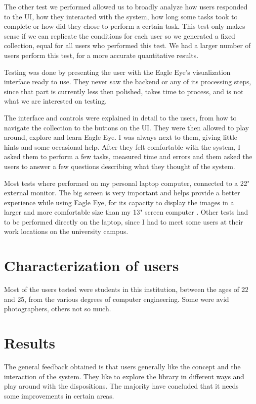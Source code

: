 The other test we performed allowed us to broadly analyze how users responded to the \ac{UI}, how they interacted with the system, how long some tasks took to complete or how did they chose to perform a certain task. This test only makes sense if we can replicate the conditions for each user so we generated a fixed collection, equal for all users who performed this test. We had a larger number of users perform this test, for a more accurate quantitative results. 

Testing was done by presenting the user with the Eagle Eye's visualization interface ready to use. They never saw the backend or any of its processing steps, since that part is currently less then polished, takes time to process, and is not what we are interested on testing.

The interface and controls were explained in detail to the users, from how to navigate the collection to the buttons on the \ac{UI}. They were then allowed to play around, explore and learn Eagle Eye. I was always next to them, giving little hints and some occasional help. After they felt comfortable with the system, I asked them to perform a few tasks, measured time and errors and them asked the users to answer a few questions describing what they thought of the system.

Most tests where performed on my personal laptop computer, connected to a 22" external monitor. The big screen is very important and helps provide a better experience while using Eagle Eye, for its capacity to display the images in a larger and more comfortable size than my 13" screen computer . Other tests had to be performed directly on the laptop, since I had to meet some users at their work locations on the university campus.

\section{Characterization of users}

Most of the users tested were students in this institution, between the ages of 22 and 25, from the various degrees of computer engineering. Some were avid photographers, others not so much.



\section{Results}

The general feedback obtained is that users generally like the concept and the interaction of the system. They like to explore the library in different ways and play around with the dispositions. The majority have concluded that it needs some improvements in certain areas.

